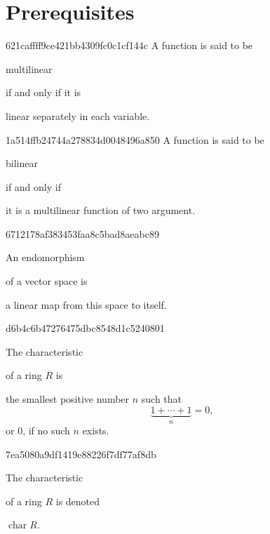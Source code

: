 


\section{Prerequisites}
\begin{note}{621caffff9ce421bb4309fc0c1cf144c}
    A function is said to be \begin{icloze}{2}multilinear\end{icloze} if and only if it is \begin{icloze}{1}linear separately in each variable.\end{icloze}
\end{note}

\begin{note}{1a514ffb24744a278834d0048496a850}
    A function is said to be \begin{icloze}{2}bilinear\end{icloze} if and only if \begin{icloze}{1}it is a multilinear function of two argument.\end{icloze}
\end{note}

\begin{note}{6712178af383453faa8c5bad8aeabc89}
    \begin{icloze}{2}An endomorphism\end{icloze} of a vector space is \begin{icloze}{1}a linear map from this space to itself.\end{icloze}
\end{note}

\begin{note}{d6b4c6b47276475dbc8548d1c5240801}
    \begin{icloze}{2}The characteristic\end{icloze} of a ring \( R \) is \begin{icloze}{1}the smallest positive number \( n \) such that
    \[
        \underbrace{1 + \cdots + 1}_{n} = 0,
    \]
    or \( 0 \), if no such \( n \) exists.
    \end{icloze}
\end{note}

\begin{note}{7ea5080a9df1419e88226f7df77af8db}
    \begin{icloze}{1}The characteristic\end{icloze} of a ring \( R \) is denoted \begin{icloze}{2}\( \operatorname{char} R \).\end{icloze}
\end{note}

